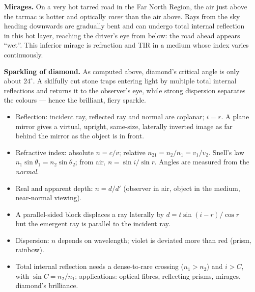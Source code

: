 \documentclass[11pt]{article}
\begin{document}
\textbf{Mirages.} On a very hot tarred road in the Far North Region, the air just above the tarmac is hotter and optically \emph{rarer} than the air above. Rays from the sky heading downwards are gradually bent and can undergo total internal reflection in this hot layer, reaching the driver's eye from below: the road ahead appears ``wet''. This inferior mirage is refraction and TIR in a medium whose index varies continuously.

\textbf{Sparkling of diamond.} As computed above, diamond's critical angle is only about $24^{\circ}$. A skilfully cut stone traps entering light by multiple total internal reflections and returns it to the observer's eye, while strong dispersion separates the colours --- hence the brilliant, fiery sparkle.

\begin{aretenir}
\begin{itemize}
\item Reflection: incident ray, reflected ray and normal are coplanar; $i = r$. A plane mirror gives a virtual, upright, same-size, laterally inverted image as far behind the mirror as the object is in front.
\item Refractive index: absolute $n = c/v$; relative $n_{21} = n_2/n_1 = v_1/v_2$. Snell's law $n_1\sin\theta_1 = n_2\sin\theta_2$; from air, $n = \sin i / \sin r$. Angles are measured from the \emph{normal}.
\item Real and apparent depth: $n = d/d'$ (observer in air, object in the medium, near-normal viewing).
\item A parallel-sided block displaces a ray laterally by $d = t\sin(i-r)/\cos r$ but the emergent ray is parallel to the incident ray.
\item Dispersion: $n$ depends on wavelength; violet is deviated more than red (prism, rainbow).
\item Total internal reflection needs a dense-to-rare crossing ($n_1 > n_2$) and $i > C$, with $\sin C = n_2/n_1$; applications: optical fibres, reflecting prisms, mirages, diamond's brilliance.
\end{itemize}
\end{aretenir}
\end{document}

